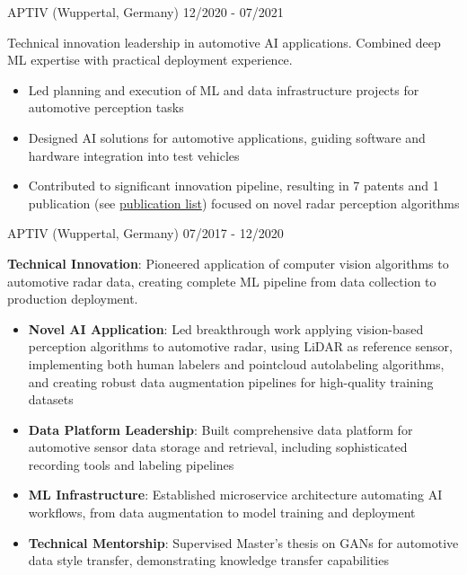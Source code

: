 \documentclass[singlesided,
               paper=a4,
               fontsize=10pt
              ]{my-resume}
\begin{document}
%
    {APTIV (Wuppertal, Germany)}
    {12/2020 - 07/2021}
    {
        Technical innovation leadership in automotive AI applications. Combined deep ML expertise with practical deployment experience.
        \begin{itemize}[leftmargin=2em]
            \item Led planning and execution of ML and data infrastructure projects for automotive perception tasks
            \item Designed AI solutions for automotive applications, guiding software and hardware integration into test vehicles
            \item Contributed to significant innovation pipeline, resulting in 7 patents and 1 publication (see \href{https://scholar.google.com/citations?hl=de&user=MnU8ZxwAAAAJ}{publication list}) focused on novel radar perception algorithms
        \end{itemize}
    }
%
    {APTIV (Wuppertal, Germany)}
    {07/2017 - 12/2020}
    {
        \textbf{Technical Innovation}: Pioneered application of computer vision algorithms to automotive radar data, creating complete ML pipeline from data collection to production deployment.
        \begin{itemize}[leftmargin=2em]
            \item \textbf{Novel AI Application}: Led breakthrough work applying vision-based perception algorithms to automotive radar, using LiDAR as reference sensor, implementing both human labelers and pointcloud autolabeling algorithms, and creating robust data augmentation pipelines for high-quality training datasets
            \item \textbf{Data Platform Leadership}: Built comprehensive data platform for automotive sensor data storage and retrieval, including sophisticated recording tools and labeling pipelines
            \item \textbf{ML Infrastructure}: Established microservice architecture automating AI workflows, from data augmentation to model training and deployment
            \item \textbf{Technical Mentorship}: Supervised Master's thesis on GANs for automotive data style transfer, demonstrating knowledge transfer capabilities
        \end{itemize}
    }
\end{document}
